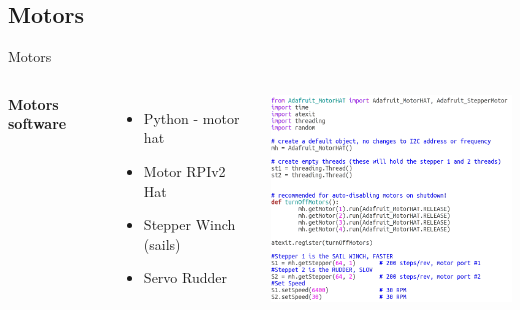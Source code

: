 \documentclass[aspectratio=169,unknownkeysallowed,xcolor=dvipsnames,beamer]{beamer} %
\begin{document}
{
\begin{frame}[plain]
\end{frame}}

\subsection{Motors}
\begin{frame}[fragile]{Motors}
\begin{columns}
\textbf{Motors software}
\vspace{5mm}
\begin{itemize}
 \item Python - motor hat 
 \item Motor RPIv2 Hat
 \item Stepper Winch (sails)
 \item Servo Rudder
 \end{itemize}
\begin{center}
 \includegraphics[width=8cm]{motors_py}
\end{center}
\end{columns}
\end{frame}
\end{document}
